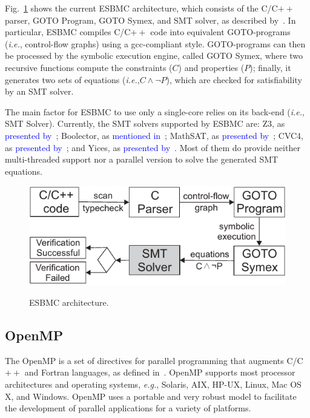 \documentclass{doublecol-new}
\theoremstyle{TH}{
\newtheorem{lemma}{Lemma}
\newtheorem{theorem}[lemma]{Theorem}
\newtheorem{corrolary}[lemma]{Corrolary}
\newtheorem{conjecture}[lemma]{Conjecture}
\newtheorem{proposition}[lemma]{Proposition}
\newtheorem{claim}[lemma]{Claim}
\newtheorem{stheorem}[lemma]{Wrong Theorem}
\newtheorem{algorithm}{Algorithm}
}
\theoremstyle{THrm}{
\newtheorem{definition}{Definition}[section]
\newtheorem{question}{Question}[section]
\newtheorem{remark}{Remark}
\newtheorem{scheme}{Scheme}
}
\theoremstyle{THhit}{
\newtheorem{case}{Case}[section]
}
\begin{document}
Fig.~\ref{ESBMC-Architecture} shows the current ESBMC architecture, which consists of the C/C$++$ parser, GOTO Program, GOTO Symex, and SMT solver, as described by~\cite{Ramalho2013}. In particular, ESBMC compiles C/C$++$ code into equivalent GOTO-programs ({\it i.e.}, control-flow graphs) using a gcc-compliant style. GOTO-programs can then be processed by the symbolic execution engine, called GOTO Symex, where two recursive functions compute the constraints ($C$) and properties ($P$); finally, it generates two sets of equations ({\it i.e.},\:$C \land \neg P$), which are checked for satisfiability by an SMT solver. 

The main factor for ESBMC to use only a single-core relies on its back-end ({\it i.e.}, SMT Solver). Currently, the SMT solvers supported by ESBMC are: Z3, as \textcolor{blue}{presented by}~\cite{DeMoura2008}; Boolector, as \textcolor{blue}{mentioned in}~\cite{Brummayer2009}; MathSAT, as \textcolor{blue}{presented by}~\cite{Barrett2011}; CVC4, as \textcolor{blue}{presented by}~\cite{Bozzano2005}; and Yices, as \textcolor{blue}{presented by}~\cite{Dutertre2014}. Most of them do provide neither multi-threaded support nor a parallel version to solve the generated SMT equations.

\begin{figure}[ht]
	\caption{ESBMC architecture.}
	\centering
	\includegraphics[scale=0.9]{figures/esbmc-arch-new.pdf} 
	\label{ESBMC-Architecture}
\end{figure}

\subsection{OpenMP}
\label{OpenMP}

The OpenMP is a set of directives for parallel programming that augments C/C$++$ and Fortran languages, as defined in~\cite{OpenMP1998}. OpenMP supports most processor architectures and operating systems, {\it e.g.}, Solaris, AIX, HP-UX, Linux, Mac OS X, and Windows. OpenMP uses a portable and very robust model to facilitate the development of parallel applications for a variety of platforms. 
\end{document}
